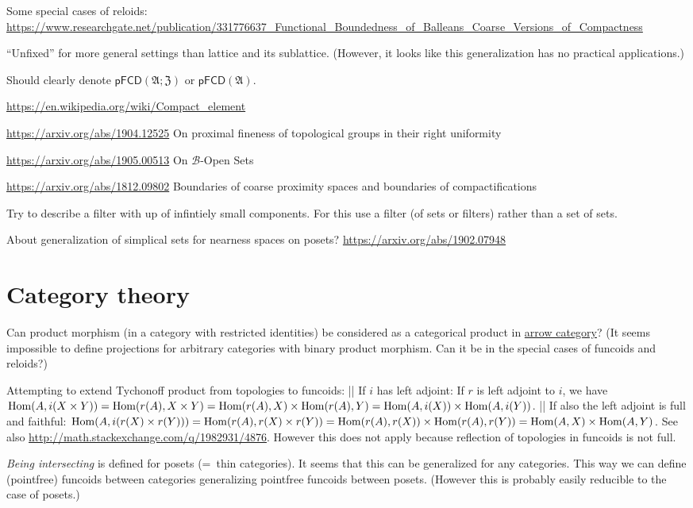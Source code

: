 \documentclass{amsart}
\begin{document}
Some special cases of reloids:
\url{https://www.researchgate.net/publication/331776637_Functional_Boundedness_of_Balleans_Coarse_Versions_of_Compactness}

``Unfixed'' for more general settings than lattice and its
sublattice. (However, it looks like this generalization has
no practical applications.)

Should clearly denote $\mathsf{pFCD}(\mathfrak{A};\mathfrak{Z})$ or $\mathsf{pFCD}(\mathfrak{A})$.

\url{https://en.wikipedia.org/wiki/Compact_element}

\url{https://arxiv.org/abs/1904.12525} On proximal fineness of topological groups in their right uniformity

\url{https://arxiv.org/abs/1905.00513}
On $\mathcal{B}$-Open Sets

\url{https://arxiv.org/abs/1812.09802} Boundaries of coarse proximity spaces and boundaries of compactifications

Try to describe a filter with up of infintiely small
components.
For this use a filter (of sets or filters) rather than a set
of sets.

About generalization of simplical sets for nearness spaces on posets?
\url{https://arxiv.org/abs/1902.07948}

\section{Category theory}

Can product morphism (in a category with restricted
identities) be considered as a categorical product
in \href{https://en.wikipedia.org/wiki/Comma_category#Arrow_category}{arrow category}?
(It seems impossible to define projections for
arbitrary categories with binary product morphism.
Can it be in the special cases of funcoids and reloids?)

Attempting to extend Tychonoff product from topologies to funcoids:
|| If $i$ has left adjoint:
If $r$ is left adjoint to $i$, we have $\operatorname{Hom}(A, i(X\times Y)) = \operatorname{Hom}(r(A), X\times Y) = \operatorname{Hom}(r(A), X)\times \operatorname{Hom}(r(A), Y) = \operatorname{Hom}(A, i(X))\times \operatorname{Hom}(A, i(Y))$.
|| If also the left adjoint is full and faithful:
$\operatorname{Hom}(A, i(r(X)\times r(Y))) = \operatorname{Hom}(r(A), r(X)\times r(Y)) = \operatorname{Hom}(r(A), r(X))\times \operatorname{Hom}(r(A), r(Y)) = \operatorname{Hom}(A, X)\times \operatorname{Hom}(A, Y)$.
See also \url{http://math.stackexchange.com/q/1982931/4876}. However this does not apply because reflection of topologies in funcoids
is not full.

\emph{Being intersecting} is defined for posets (=~thin categories). It seems that this can be generalized for any categories.
This way we can define (pointfree) funcoids between categories generalizing pointfree funcoids between posets.
(However this is probably easily reducible to the case of posets.)
\end{document}
